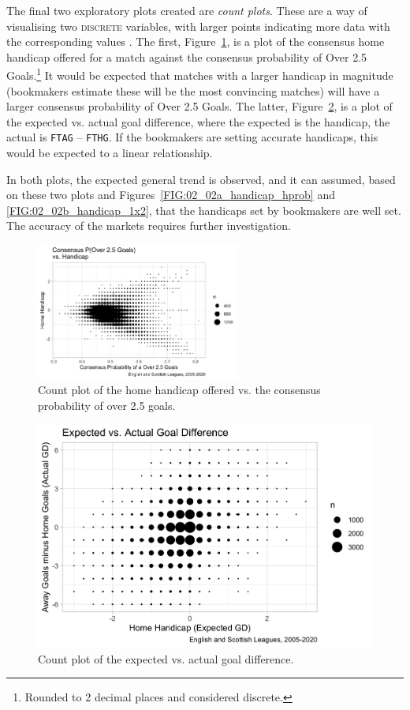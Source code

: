 \documentclass[a4paper,10pt]{report}
\begin{document}
\pagebreak
The final two exploratory plots created are \textit{count plots}. These are a way of visualising two \textsc{discrete} variables, with larger points indicating more data with the corresponding values \autocite{countPlots}. The first, Figure~\ref{FIG:02_04a_count1}, is a plot of the consensus home handicap offered for a match against the consensus probability of Over 2.5 Goals.\footnote{Rounded to 2 decimal places and considered discrete.} It would be expected that matches with a larger handicap in magnitude (bookmakers estimate these will be the most convincing matches) will have a larger consensus probability of Over 2.5 Goals. The latter, Figure~\ref{FIG:02_04b_count2}, is a plot of the expected vs. actual goal difference, where the expected is the handicap, the actual is \lstinline|FTAG| -- \lstinline|FTHG|. If the bookmakers are setting accurate handicaps, this would be expected to a linear relationship.

In both plots, the expected general trend is observed, and it can assumed, based on these two plots and Figures~\ref{FIG:02_02a_handicap_hprob} and \ref{FIG:02_02b_handicap_1x2}, that the handicaps set by bookmakers are well set. The accuracy of the markets requires further investigation.

\begin{figure}[h!]\begin{center}
		\includegraphics[width=0.6\textwidth]{ensco_08_handicap_v_over.png}
		\caption{Count plot of the home handicap offered vs. the consensus probability of over 2.5 goals.}\label{FIG:02_04a_count1}
\end{center}\end{figure}
\begin{figure}[h!]\begin{center}
		\includegraphics[width=.6\textwidth]{ensco_09_exp_v_act_goaldiff.png}
		\caption{Count plot of the expected vs. actual goal difference.}\label{FIG:02_04b_count2}
\end{center}\end{figure} 
\end{document}
